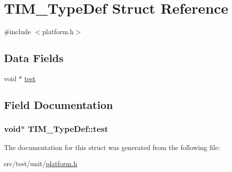 \hypertarget{structTIM__TypeDef}{\section{T\+I\+M\+\_\+\+Type\+Def Struct Reference}
\label{structTIM__TypeDef}
}


{\ttfamily \#include $<$platform.\+h$>$}

\subsection*{Data Fields}
\begin{DoxyCompactItemize}
\item 
void $\ast$ \hyperlink{structTIM__TypeDef_a40dbbc231223bbb3d7cd3d7dfed6fca7}{test}
\end{DoxyCompactItemize}


\subsection{Field Documentation}
\hypertarget{structTIM__TypeDef_a40dbbc231223bbb3d7cd3d7dfed6fca7}{
\subsubsection[{test}]{\setlength{\rightskip}{0pt plus 5cm}void$\ast$ T\+I\+M\+\_\+\+Type\+Def\+::test}}\label{structTIM__TypeDef_a40dbbc231223bbb3d7cd3d7dfed6fca7}


The documentation for this struct was generated from the following file\+:\begin{DoxyCompactItemize}
\item 
src/test/unit/\hyperlink{test_2unit_2platform_8h}{platform.\+h}\end{DoxyCompactItemize}
